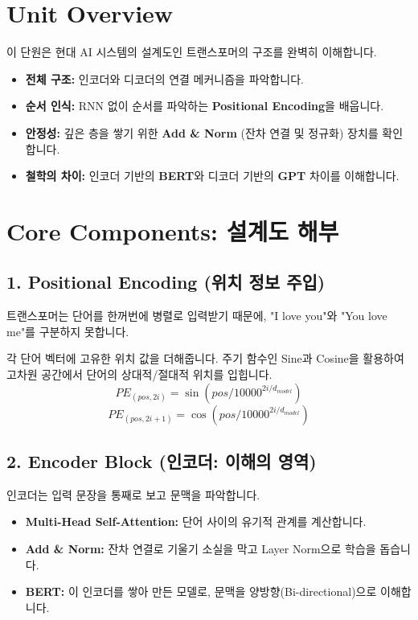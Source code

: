 \documentclass[11pt,a4paper]{book}
\theoremstyle{definition}
\begin{document}
\section{Unit Overview}
\begin{summarybox}[title={핵심 목표}]
이 단원은 현대 AI 시스템의 설계도인 트랜스포머의 구조를 완벽히 이해합니다.
\begin{itemize}
    \item \textbf{전체 구조:} 인코더와 디코더의 연결 메커니즘을 파악합니다.
    \item \textbf{순서 인식:} RNN 없이 순서를 파악하는 \textbf{Positional Encoding}을 배웁니다.
    \item \textbf{안정성:} 깊은 층을 쌓기 위한 \textbf{Add \& Norm} (잔차 연결 및 정규화) 장치를 확인합니다.
    \item \textbf{철학의 차이:} 인코더 기반의 \textbf{BERT}와 디코더 기반의 \textbf{GPT} 차이를 이해합니다.
\end{itemize}
\end{summarybox}

\section{Core Components: 설계도 해부}

\subsection{1. Positional Encoding (위치 정보 주입)}
트랜스포머는 단어를 한꺼번에 병렬로 입력받기 때문에, "I love you"와 "You love me"를 구분하지 못합니다. 

\begin{mathbox}[title={위치 신호 주입}]
각 단어 벡터에 고유한 위치 값을 더해줍니다. 주기 함수인 Sine과 Cosine을 활용하여 고차원 공간에서 단어의 상대적/절대적 위치를 입힙니다.
$$ PE_{(pos, 2i)} = \sin(pos/10000^{2i/d_{model}}) $$
$$ PE_{(pos, 2i+1)} = \cos(pos/10000^{2i/d_{model}}) $$
\end{mathbox}


\subsection{2. Encoder Block (인코더: 이해의 영역)}
인코더는 입력 문장을 통째로 보고 문맥을 파악합니다.
\begin{itemize}
    \item \textbf{Multi-Head Self-Attention:} 단어 사이의 유기적 관계를 계산합니다.
    \item \textbf{Add \& Norm:} 잔차 연결로 기울기 소실을 막고 Layer Norm으로 학습을 돕습니다.
    \item \textbf{BERT:} 이 인코더를 쌓아 만든 모델로, 문맥을 양방향(Bi-directional)으로 이해합니다.
\end{itemize}
\end{document}
